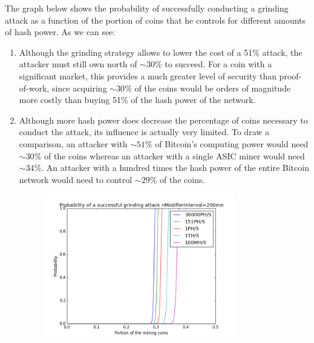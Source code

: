 \documentclass[a4paper,11pt]{article}
\begin{document}
The graph below shows the probability of successfully conducting a grinding attack as a function of the portion of coins that he controls for different amounts of hash power.
As we can see:
\begin{enumerate}
\setlength{\itemsep}{0pt}
\item{Although the grinding strategy allows to lower the cost of a 51\% attack, the attacker must still own north of $\sim30\%$ to succeed. For a coin with a significant market, this provides a much greater level of security than proof-of-work, since acquiring $\sim30\%$ of the coins would be orders of magnitude more costly than buying 51\% of the hash power of the network.}
\item{Although more hash power does decrease the percentage of coins necessary to conduct the attack, its influence is actually very limited. To draw a comparison, an attacker with $\sim51\%$ of Bitcoin's computing power would need $\sim30\%$ of the coins whereas an attacker with a single ASIC miner would need $\sim34\%$. An attacker with a hundred times the hash power of the entire Bitcoin network would need to control $\sim29\%$ of the coins.}
\end{enumerate}


\begin{figure}[H]
\centering
\includegraphics[width=96mm,height=63mm]{07_NC_200min.png}
\caption{}
\end{figure}

\end{document}
